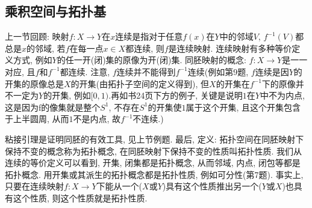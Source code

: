 \documentclass{ctexart}%
\theoremstyle{definition}
\theoremstyle{remark}
\begin{document}
\subsection{乘积空间与拓扑基}

上一节回顾: 映射$f:X\rightarrow Y$在$x$连续是指对于任意$f(x)$在$Y$中的邻域$V$, $f^{-1}(V)$都总是$x$的邻域, 若$f$在每一点$x\in X$都连续, 则$f$是连续映射. 连续映射有多种等价定义方式, 例如$Y$的任一开(闭)集的原像为开(闭)集. 同胚映射的概念: $f:X\rightarrow Y$是一一对应, 且$f$和$f^{-1}$都连续. 注意, $f$连续并不能得到$f^{-1}$连续(例如第9题, $f$连续是因$Y$的开集的原像总是$X$的开集(由拓扑子空间的定义得到), 但$X$的开集在$f^{-1}$下的原像并不一定为$Y$的开集, 例如$[0,1)$.再如书24页下方的例子, 关键是说明$1$在$Y$中不为内点, 这是因为f的像集就是整个$S^1$, 不存在$S^1$的开集使$1$属于这个开集, 且这个开集包含于上半圆周, 从而$1$不是内点, 故$f^{-1}$不连续.)

粘接引理是证明同胚的有效工具, 见上节例题. 最后, 定义: 拓扑空间在同胚映射下保持不变的概念称为拓扑概念, 在同胚映射下保持不变的性质叫拓扑性质. 我们从连续的等价定义可以看到, 开集, 闭集都是拓扑概念, 从而邻域, 内点, 闭包等都是拓扑概念. 用开集或其派生的拓扑概念都是拓扑性质, 例如可分性(第7题). 事实上, 只要在连续映射$f:X\rightarrow Y$下能从一个($X$或$Y$)具有这个性质推出另一个($Y$或$X$)也具有这个性质, 则这个性质就是拓扑性质. 
\end{document}
